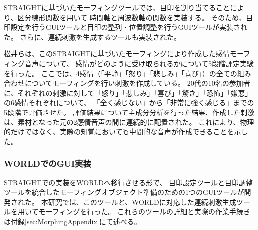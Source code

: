 STRAIGHTに基づいたモーフィングツールでは、目印を割り当てることにより、区分線形関数を用いて
時間軸と周波数軸の関数を実装する\cite{kawahara2013morph}。
そのため、目印設定を行うGUIツールと目印の整列・位置調整を行うGUIツールが実装された。
さらに、連続刺激を生成するツールも実装された。


松井らは、このSTRAIGHTに基づいたモーフィングにより作成した感情モーフィング音声について、
感情がどのように受け取られるかについて5段階評定実験を行った\cite{matsui2003STRAIGHT}。
ここでは、4感情（「平静」「怒り」「悲しみ」「喜び」）の全ての組み合わせについてモーフィングを行い刺激を作成している。
20代の10名の参加者に、それぞれの刺激に対して「怒り」「悲しみ」「喜び」「驚き」「恐怖」「嫌悪」の6感情それぞれについて、
「全く感じない」から「非常に強く感じる」までの5段階で評価させた。
評価結果について主成分分析を行った結果、作成した刺激は、素材となった元の2感情音声の間に連続的に配置された。
これにより、物理的だけではなく、実際の知覚においても中間的な音声が作成できることを示した。

\subsubsection{WORLDでのGUI実装}
STRAIGHTでの実装をWORLDへ移行させる形で、
目印設定ツールと目印調整ツールを統合したモーフィングオブジェクト準備のための1つのGUIツールが開発された\cite{kawahara2024interactive}。
本研究では、このツールと、WORLDに対応した連続刺激生成ツールを用いてモーフィングを行った。
これらのツールの詳細と実際の作業手続きは付録\ref{sec:MorphingAppendix}にて述べる。













